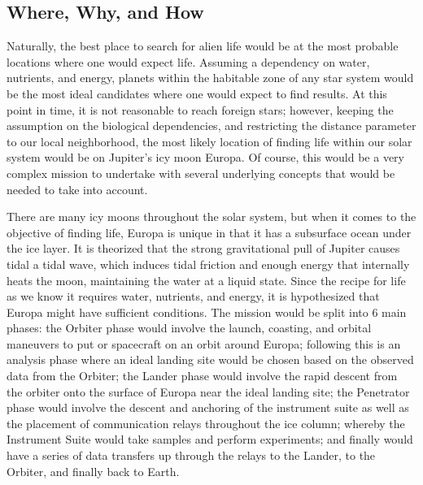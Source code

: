 \subsection{Where, Why, and How}
Naturally, the best place to search for alien life would be at the most probable locations where one would expect life. Assuming a dependency on water, nutrients, and energy, planets within the habitable zone of any star system would be the most ideal candidates where one would expect to find results. At this point in time, it is not reasonable to reach foreign stars; however, keeping the assumption on the biological dependencies, and restricting the distance parameter to our local neighborhood, the most likely location of finding life within our solar system would be on Jupiter's icy moon Europa. Of course, this would be a very complex mission to undertake with several underlying concepts that would be needed to take into account.

There are many icy moons throughout the solar system, but when it comes to the objective of finding life, Europa is unique in that it has a subsurface ocean under the ice layer. It is theorized that the strong gravitational pull of Jupiter causes tidal a tidal wave, which induces tidal friction and enough energy that internally heats the moon, maintaining the water at a liquid state. Since the recipe for life as we know it requires water, nutrients, and energy, it is hypothesized that Europa might have sufficient conditions. The mission would be split into 6 main phases: the Orbiter phase would involve the launch, coasting, and orbital maneuvers to put or spacecraft on an orbit around Europa; following this is an analysis phase where an ideal landing site would be chosen based on the observed data from the Orbiter; the Lander phase would involve the rapid descent from the orbiter onto the surface of Europa near the ideal landing site; the Penetrator phase would involve the descent and anchoring of the instrument suite as well as the placement of communication relays throughout the ice column; whereby the Instrument Suite would take samples and perform experiments; and finally would have a series of data transfers up through the relays to the Lander, to the Orbiter, and finally back to Earth.

